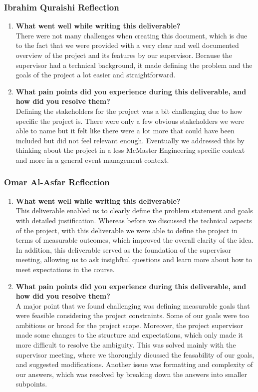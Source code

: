 \documentclass{article}
\begin{document}
\subsubsection*{Ibrahim Quraishi Reflection}
\begin{enumerate}
    \item \textbf{What went well while writing this deliverable? } \\
    There were not many challenges when creating this document, which is due to the fact that we were provided with a very clear and well documented overview of the project and its features by our supervisor. Because the supervisor had a technical background, it made defining the problem and the goals of the project a lot easier and straightforward.
    \item \textbf{What pain points did you experience during this deliverable, and how did you resolve them?} \\
    Defining the stakeholders for the project was a bit challenging due to how specific the project is. There were only a few obvious stakeholders we were able to name but it felt like there were a lot more that could have been included but did not feel relevant enough. Eventually we addressed this by thinking about the project in a less McMaster Engineering specific context and more in a general event management context.
\end{enumerate}

\subsubsection*{Omar Al-Asfar Reflection}
\begin{enumerate}
    \item \textbf{What went well while writing this deliverable? } \\
    This deliverable enabled us to clearly define the problem statement and goals with detailed justification. Whereas before we discussed the technical aspects of the project, with this deliverable we were able to define the project in terms of measurable outcomes, which improved the overall clarity of the idea. In addition, this deliverable served as the foundation of the supervisor meeting, allowing us to ask insighftul questions and learn more about how to meet expectations in the course.
    \item \textbf{What pain points did you experience during this deliverable, and how did you resolve them?} \\
    A major point that we found challenging was defining measurable goals that were feasible considering the project constraints. Some of our goals were too ambitious or broad for the project scope. Moreover, the project supervisor made some changes to the structure and expectations, which only made it more difficult to resolve the ambiguity. This was solved mainly with the supervisor meeting, where we thoroughly dicussed the feasability of our goals, and suggested modifications. Another issue was formatting and complexity of our answers, which was resolved by breaking down the answers into smaller subpoints.
\end{enumerate}
\end{document}
